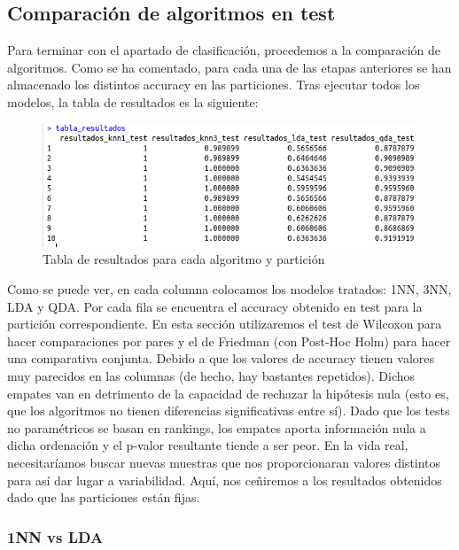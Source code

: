 \subsection{Comparación de algoritmos en test}

Para terminar con el apartado de clasificación, procedemos a la comparación de algoritmos. Como se ha comentado, para cada una de las etapas anteriores se han almacenado los distintos accuracy en las particiones. Tras ejecutar todos los modelos, la tabla de resultados es la siguiente:

\begin{figure}[H] %
	\centering
	\includegraphics[scale=0.6]{tabla-resultados.png}  %
	\caption{Tabla de resultados para cada algoritmo y partición} 
	\label{fig:tabla-res}
\end{figure}

Como se puede ver, en cada columna colocamos los modelos tratados: 1NN, 3NN, LDA y QDA. Por cada fila se encuentra el accuracy obtenido en test para la partición correspondiente. En esta sección utilizaremos el test de Wilcoxon para hacer comparaciones por pares y el de Friedman (con Post-Hoc Holm) para hacer una comparativa conjunta. Debido a que los valores de accuracy tienen valores muy parecidos en las columnas (de hecho, hay bastantes repetidos). Dichos empates van en detrimento de la capacidad de rechazar la hipótesis nula (esto es, que los algoritmos no tienen diferencias significativas entre sí). Dado que los tests no paramétricos se basan en rankings, los empates aporta información nula a dicha ordenación y el p-valor resultante tiende a ser peor. En la vida real, necesitaríamos buscar nuevas muestras que nos proporcionaran valores distintos para así dar lugar a variabilidad. Aquí, nos ceñiremos a los resultados obtenidos dado que las particiones están fijas.

\subsubsection{1NN vs LDA}

